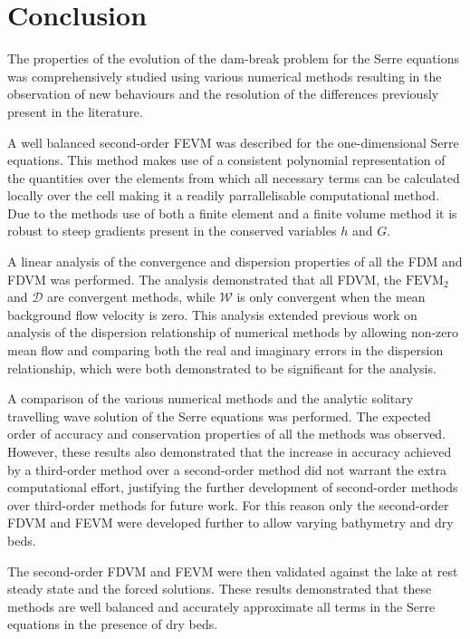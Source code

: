 
\chapter{Conclusion}
\label{chp:Conclusion}



The properties of the evolution of the dam-break problem for the Serre equations was comprehensively studied using various numerical methods resulting in the observation of new behaviours and the resolution of the differences previously present in the literature.  

A well balanced second-order FEVM was described for the one-dimensional Serre equations. This method makes use of a consistent polynomial representation of the quantities over the elements from which all necessary terms can be calculated locally over the cell making it a readily parrallelisable computational method. Due to the methods use of both a finite element and a finite volume method it is robust to steep gradients present in the conserved variables $h$ and $G$. 

A linear analysis of the convergence and dispersion properties of all the FDM and FDVM \cite{Pitt-2018-61} was performed. The analysis demonstrated that all FDVM, the $\text{FEVM}_2$ and $\mathcal{D}$ are convergent methods, while $\mathcal{W}$ is only convergent when the mean background flow velocity is zero. This analysis extended previous work on analysis of the dispersion relationship of numerical methods by allowing non-zero mean flow and comparing both the real and imaginary errors in the dispersion relationship, which were both demonstrated to be significant for the analysis. 

A comparison of the various numerical methods and the analytic solitary travelling wave solution of the Serre equations was performed. The expected order of accuracy and conservation properties of all the methods was observed. However, these results also demonstrated that the increase in accuracy achieved by a third-order method over a second-order method did not warrant the extra computational effort, justifying the further development of second-order methods over third-order methods for future work. For this reason only the second-order FDVM and FEVM were developed further to allow varying bathymetry and dry beds.

The second-order FDVM and FEVM were then validated against the lake at rest steady state and the forced solutions. These results demonstrated that these methods are well balanced and accurately approximate all terms in the Serre equations in the presence of dry beds. 

